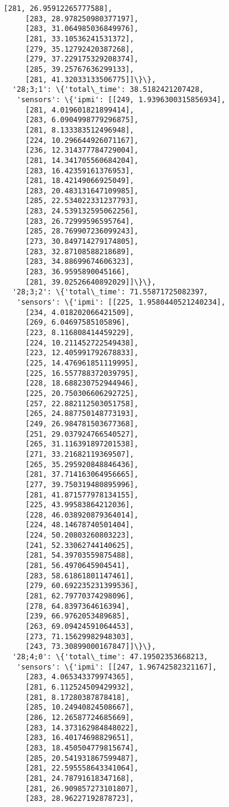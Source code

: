 \documentclass[11pt]{article}
\begin{document}
\begin{tcolorbox}[breakable, size=fbox, boxrule=.5pt, pad at break*=1mm, opacityfill=0]
\begin{Verbatim}[commandchars=\\\{\}]
     [281, 26.95912265777588],
     [283, 28.978250980377197],
     [283, 31.064985036849976],
     [281, 33.10536241531372],
     [279, 35.12792420387268],
     [279, 37.229175329208374],
     [285, 39.25767636299133],
     [281, 41.32033133506775]]\}\},
  '28;3;1': \{'total\_time': 38.5182421207428,
   'sensors': \{'ipmi': [[249, 1.9396300315856934],
     [281, 4.019601821899414],
     [283, 6.0904998779296875],
     [281, 8.133383512496948],
     [224, 10.296644926071167],
     [236, 12.314377784729004],
     [281, 14.341705560684204],
     [283, 16.42359161376953],
     [281, 18.42149066925049],
     [283, 20.483131647109985],
     [285, 22.534022331237793],
     [283, 24.539132595062256],
     [283, 26.72999596595764],
     [285, 28.769907236099243],
     [273, 30.849714279174805],
     [283, 32.87108588218689],
     [283, 34.88699674606323],
     [283, 36.9595890045166],
     [281, 39.02526640892029]]\}\},
  '28;3;2': \{'total\_time': 71.55871725082397,
   'sensors': \{'ipmi': [[225, 1.9580440521240234],
     [234, 4.018202066421509],
     [269, 6.04697585105896],
     [223, 8.116808414459229],
     [224, 10.211452722549438],
     [223, 12.405991792678833],
     [225, 14.476961851119995],
     [225, 16.557788372039795],
     [228, 18.688230752944946],
     [225, 20.750306606292725],
     [257, 22.882112503051758],
     [265, 24.887750148773193],
     [249, 26.984781503677368],
     [251, 29.037924766540527],
     [265, 31.116391897201538],
     [271, 33.21682119369507],
     [265, 35.295920848846436],
     [281, 37.714163064956665],
     [277, 39.750319480895996],
     [281, 41.871577978134155],
     [225, 43.99583864212036],
     [228, 46.038920879364014],
     [224, 48.14678740501404],
     [224, 50.20803260803223],
     [241, 52.33062744140625],
     [281, 54.39703559875488],
     [281, 56.4970645904541],
     [283, 58.61861801147461],
     [279, 60.692235231399536],
     [281, 62.79770374298096],
     [278, 64.8397364616394],
     [239, 66.9762053489685],
     [263, 69.09424591064453],
     [273, 71.15629982948303],
     [243, 73.30899000167847]]\}\},
  '28;4;0': \{'total\_time': 47.19502353668213,
   'sensors': \{'ipmi': [[247, 1.96742582321167],
     [283, 4.065343379974365],
     [281, 6.112524509429932],
     [281, 8.17280387878418],
     [285, 10.24940824508667],
     [286, 12.26587724685669],
     [283, 14.373162984848022],
     [283, 16.40174698829651],
     [283, 18.450504779815674],
     [285, 20.541931867599487],
     [281, 22.595558643341064],
     [281, 24.78791618347168],
     [281, 26.909857273101807],
     [283, 28.96227192878723],

\end{Verbatim}
\end{tcolorbox}
\end{document}

